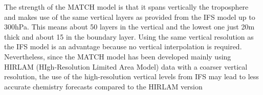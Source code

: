 \documentclass[9pt]{report}
\begin{document}
The strength of the MATCH model is that it spans vertically the troposphere and makes use of the same vertical layers as provided from the IFS model up to 300hPa. This means about 50 layers in the vertical and the lowest one just 20m thick and about 15 in the boundary layer. 
Using the same vertical resolution as the IFS model is an advantage because no vertical interpolation is required. 
Nevertheless, since the MATCH model has been developed mainly using HIRLAM (HIgh-Resolution Limited Area Model) data with a coarser vertical resolution, the use of the high-resolution vertical levels from IFS may lead to less accurate chemistry forecasts compared to the HIRLAM version%

\begin{table}[h!]%
\begin{mdcenter}%
{}%
\end{mdcenter}\label{match-portfolio}%
\end{table}%
\end{document}
